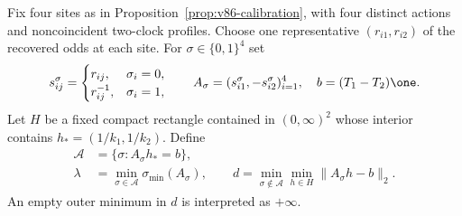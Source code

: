 Fix four sites as in Proposition~\ref{prop:v86-calibration}, with four
distinct actions and noncoincident two-clock profiles. Choose one
representative $(r_{i1},r_{i2})$ of the recovered odds at each site.
For $\sigma\in\{0,1\}^4$ set
\[
 s_{ij}^{\sigma}=\begin{cases}r_{ij},&\sigma_i=0,\\
                              r_{ij}^{-1},&\sigma_i=1,
             \end{cases}\qquad
 A_\sigma=(s_{i1}^{\sigma},-s_{i2}^{\sigma})_{i=1}^4,
 \quad b=(T_1-T_2)\one.
\]
Let $H$ be a fixed compact rectangle contained in $(0,\infty)^2$
whose interior contains $h_*=(1/k_1,1/k_2)$. Define
\begin{align}
 \mathcal A&=\{\sigma:A_\sigma h_*=b\},\nonumber\\
 \lambda&=\min_{\sigma\in\mathcal A}\sigma_{\min}(A_\sigma),
 \qquad d=\min_{\sigma\notin\mathcal A}\min_{h\in H}
                                    \|A_\sigma h-b\|_2.
                                               \label{eq:v87-anchor-certificate}
\end{align}
An empty outer minimum in $d$ is interpreted as $+\infty$.

